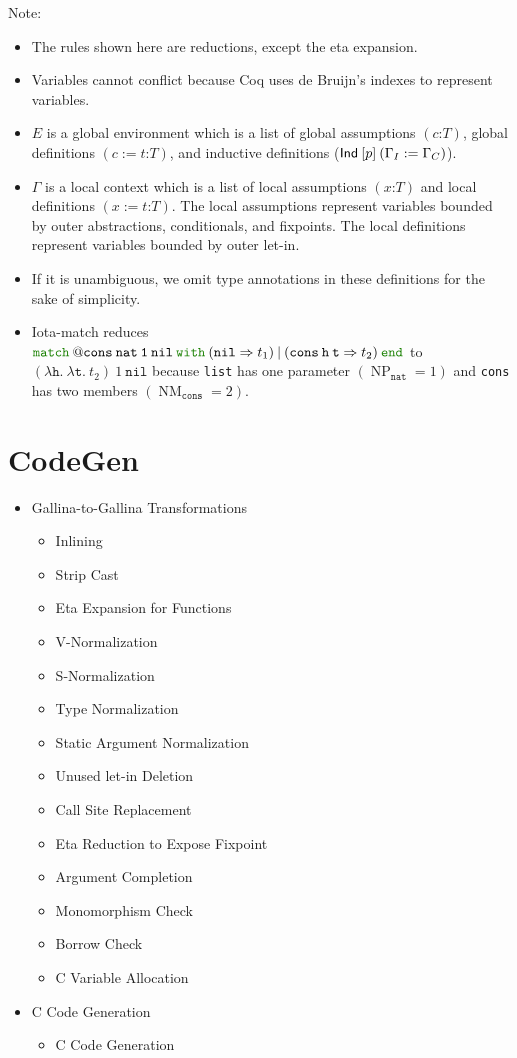 \documentclass[a4paper,fleqn]{article}
\def\coq{\textrm{Coq}}
\def\gallina{\textrm{Gallina}}
\newcommand{\kwmatch}{\mbox{\color{mygreen}\ttfamily match}}
\newcommand{\kwwith}{\mbox{\color{mygreen}\ttfamily with}}
\newcommand{\kwend}{\mbox{\color{mygreen}\ttfamily end}}
\newcommand{\lam}[2]{\lambda #1.\:#2}
\newcommand{\gassum}[2]{(#1\mathord{:}#2)}
\newcommand{\glodef}[3]{(#1:=#2\mathord{:}#3)}
\newcommand{\lassum}[2]{(#1\mathord{:}#2)}
\newcommand{\ldef}[3]{(#1:=#2\mathord{:}#3)}
\DeclareMathOperator{\NP}{NP} %
\DeclareMathOperator{\NM}{NM} %
\begin{document}
{\small Note:
\begin{itemize}
  \item The rules shown here are reductions, except the eta expansion.
  \item Variables cannot conflict because \coq{} uses de Bruijn's indexes to represent variables.
  \item $E$ is a global environment which is a list of
    global assumptions $\gassum{c}{T}$,
    global definitions $\glodef{c}{t}{T}$, and
    inductive definitions ($\text{\sf Ind}\:[p]\:(\Gamma_I := \Gamma_C)$).
  \item $\Gamma$ is a local context which is a list of
    local assumptions $\lassum{x}{T}$ and
    local definitions $\ldef{x}{t}{T}$.
    The local assumptions represent variables bounded by outer abstractions, conditionals, and fixpoints.
    The local definitions represent variables bounded by outer let-in.
  \item If it is unambiguous, we omit type annotations in these definitions for the sake of simplicity.
  \item Iota-match reduces $\kwmatch\:\mathtt{@cons\:nat\:1\:nil}\:\kwwith\:(\mathtt{nil} \Rightarrow t_1)\:|\:(\mathtt{cons}\:\mathtt{h}\:\mathtt{t} \Rightarrow t_2)\:\kwend$ to $(\lam{\mathtt{h}}{\lam{\mathtt{t}}{t_2}})\:1\:\mathtt{nil}$
    because \lstinline!list! has one parameter $(\NP_\mathtt{nat}=1)$ and \lstinline!cons! has two members $(\NM_\mathtt{cons}=2)$.
\end{itemize}}

\section{CodeGen}\label{sec:codegen}

\begin{itemize}
\item \gallina-to-\gallina{} Transformations
  \begin{itemize}
  \item Inlining
  \item Strip Cast
  \item Eta Expansion for Functions
  \item V-Normalization
  \item S-Normalization
  \item Type Normalization
  \item Static Argument Normalization
  \item Unused let-in Deletion
  \item Call Site Replacement
  \item Eta Reduction to Expose Fixpoint
  \item Argument Completion
  \item Monomorphism Check
  \item Borrow Check
  \item C Variable Allocation
  \end{itemize}
\item C Code Generation
  \begin{itemize}
  \item C Code Generation
  \end{itemize}
\end{itemize}
\end{document}
